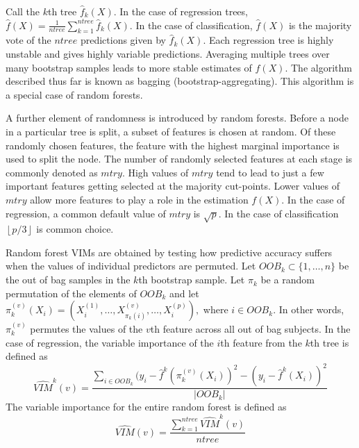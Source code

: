 \documentclass[article,shortnames]{jss}
\begin{document}
Call the $k$th tree $\hat{f}_{k}(X)$.  In the case of regression trees,
$\hat{f}(X)=\frac{1}{ntree}\sum_{k=1}^{ntree}\hat{f}_{k}(X)$.  In the case of classification, $\hat{f}(X)$ is the majority vote of the $ntree$ predictions given
by $\hat{f}_{k}(X)$.  Each regression tree is highly unstable and gives highly variable predictions.  Averaging multiple trees over
many bootstrap samples leads to more stable estimates of $f(X)$.  The algorithm described thus far is known as bagging (bootstrap-aggregating).  This 
algorithm is a special case of random forests.  

A further element of randomness is introduced by random forests.  Before a node in a particular tree is split, a subset of features is chosen at random.  Of these randomly 
chosen features, the feature with the highest marginal importance is used to split the node.  The number of randomly selected features at each stage is
commonly denoted as $mtry$.  High values of $mtry$ tend to lead to just a few important features getting selected at the majority cut-points.
Lower values of $mtry$ allow more features to play a role in the estimation $f(X)$.  In the case of regression, a common default value of $mtry$ is $\sqrt{p}$.
In the case of classification  $\left\lfloor p/3 \right\rfloor$ is common choice.
  
Random forest VIMs are obtained by testing how predictive accuracy suffers when the values of individual predictors are permuted.  Let $OOB_{k} \subset \{1,\ldots, n\}$ 
be the out of bag samples in the $k$th bootstrap sample.  Let $\pi_{k}$ be a random permutation of the elements of $OOB_{k}$ and let   
$\pi_{k}^{(v)}(X_{i}) = (X_{i}^{(1)},\ldots,X_{\pi_{k}(i)}^{(v)},\ldots,X_{i}^{(p)}),$ where $i \in OOB_{k}$.   In other words, $\pi_{k}^{(v)}$ 
permutes the values of the $v$th feature across all out of bag subjects.  In the case of regression, the variable importance of the $i$th feature from the $k$th tree is defined as
\begin{equation}
\widehat{VIM}^{k}(v)= \frac{\sum_{i \in OOB_{k}}(y_{i}-\hat{f}^{k}(\pi_{k}^{(v)}(X_{i}))^{2} - (y_{i} - \hat{f}^{k}(X_{i}))^{2}}{|OOB_{k}|}
\end{equation}
The variable importance for the entire random forest is defined as
\begin{equation}
\widehat{VIM}(v) = \frac{\sum_{k=1}^{ntree}\widehat{VIM}^{k}(v)}{ntree}
\end{equation}
\end{document}
